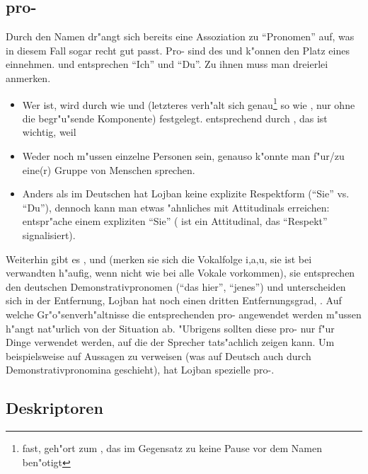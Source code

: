 \subsection{pro-}
Durch den Namen dr"angt sich bereits eine Assoziation zu ``Pronomen'' auf, was in diesem Fall sogar recht gut passt. Pro- sind  des 
 und k"onnen den Platz eines  einnehmen.
 und  entsprechen ``Ich'' und ``Du''. Zu ihnen muss man dreierlei anmerken.
\begin{itemize}
\item Wer  ist, wird durch  wie  und  (letzteres verh"alt sich genau\footnote{fast,  geh"ort zum  , das
im Gegensatz zu  keine Pause vor dem Namen ben"otigt} so wie , nur ohne die begr"u"sende Komponente) festgelegt.  entsprechend durch , das
ist wichtig, weil
\item Weder  noch  m"ussen einzelne Personen sein, genauso k"onnte man f"ur/zu eine(r) Gruppe von Menschen sprechen.
\item Anders als im Deutschen hat Lojban keine explizite Respektform (``Sie'' vs. ``Du''), dennoch kann man etwas "ahnliches mit Attitudinals erreichen:  entspr"ache
einem expliziten ``Sie'' ( ist ein Attitudinal, das ``Respekt'' signalisiert).
\end{itemize}
Weiterhin gibt es ,  und  (merken sie sich die Vokalfolge i,a,u, sie ist bei verwandten  h"aufig, wenn nicht wie bei  alle Vokale
vorkommen), sie entsprechen den deutschen Demonstrativpronomen (``das hier'', ``jenes'') und unterscheiden sich in der Entfernung, Lojban hat noch einen dritten Entfernungsgrad, .
Auf welche Gr"o"senverh"altnisse die entsprechenden pro- angewendet werden m"ussen h"angt nat"urlich von der Situation ab. "Ubrigens sollten diese pro- nur
f"ur Dinge verwendet werden, auf die der Sprecher tats"achlich zeigen kann. Um beispielsweise auf Aussagen zu verweisen (was auf Deutsch auch durch Demonstrativpronomina geschieht),
hat Lojban spezielle pro-.

\subsection{Deskriptoren}

